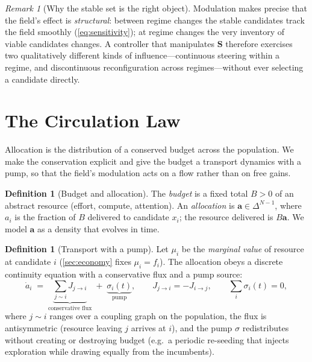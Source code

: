 \documentclass[11pt,a4paper]{article}
\theoremstyle{plain}
\theoremstyle{definition}
\newtheorem{definition}[theorem]{Definition}
\theoremstyle{remark}
\newtheorem{remark}[theorem]{Remark}
\newcommand{\simplex}{\Delta}                 %
\newcommand{\field}{\mathbf{S}}               %
\newcommand{\alloc}{\mathbf{a}}               %
\begin{document}
\begin{remark}[Why the stable set is the right object]
Modulation makes precise that the field's effect is \emph{structural}: between
regime changes the stable candidates track the field smoothly
(\cref{eq:sensitivity}); at regime changes the very inventory of viable
candidates changes. A controller that manipulates $\field$ therefore exercises
two qualitatively different kinds of influence---continuous steering within a
regime, and discontinuous reconfiguration across regimes---without ever
selecting a candidate directly.
\end{remark}

\section{The Circulation Law}
\label{sec:circulation}

Allocation is the distribution of a conserved budget across the population. We
make the conservation explicit and give the budget a transport dynamics with a
pump, so that the field's modulation acts on a flow rather than on free gains.

\begin{definition}[Budget and allocation]
\label{def:budget}
The \emph{budget} is a fixed total $B>0$ of an abstract resource (effort,
compute, attention). An \emph{allocation} is $\alloc\in\simplex^{N-1}$, where
$a_i$ is the fraction of $B$ delivered to candidate $x_i$; the resource
delivered is $B\alloc$. We model $\alloc$ as a density that evolves in time.
\end{definition}

\begin{definition}[Transport with a pump]
\label{def:transport}
Let $\mu_i$ be the \emph{marginal value} of resource at candidate $i$
(\cref{sec:economy} fixes $\mu_i=f_i$). The allocation obeys a discrete
continuity equation with a conservative flux and a pump source:
\begin{equation}
\dot a_i \;=\; \underbrace{\sum_{j\sim i}J_{j\to i}}_{\text{conservative flux}}
\;+\; \underbrace{\sigma_i(t)}_{\text{pump}},
\qquad J_{j\to i}=-J_{i\to j},\qquad \sum_i\sigma_i(t)=0,
\label{eq:continuity}
\end{equation}
where $j\sim i$ ranges over a coupling graph on the population, the flux is
antisymmetric (resource leaving $j$ arrives at $i$), and the pump $\sigma$
redistributes without creating or destroying budget (e.g.\ a periodic
re-seeding that injects exploration while drawing equally from the incumbents).
\end{definition}
\end{document}
